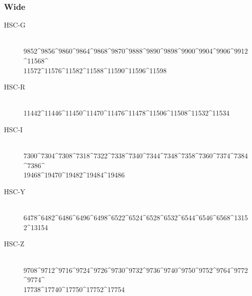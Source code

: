 \documentclass[DM,lsstdraft,STS,toc]{lsstdoc}
\begin{document}
\subsubsection{Wide}

\begin{description}

\item[HSC-G]{\hfill \\ 9852\^{}9856\^{}9860\^{}9864\^{}9868\^{}9870\^{}9888\^{}9890\^{}9898\^{}9900\^{}9904\^{}9906\^{}9912\^{}11568\^{}\\11572\^{}11576\^{}11582\^{}11588\^{}11590\^{}11596\^{}11598}
\item[HSC-R]{\hfill \\ 11442\^{}11446\^{}11450\^{}11470\^{}11476\^{}11478\^{}11506\^{}11508\^{}11532\^{}11534}
\item[HSC-I]{\hfill \\ 7300\^{}7304\^{}7308\^{}7318\^{}7322\^{}7338\^{}7340\^{}7344\^{}7348\^{}7358\^{}7360\^{}7374\^{}7384\^{}7386\^{}\\19468\^{}19470\^{}19482\^{}19484\^{}19486}
\item[HSC-Y]{\hfill \\ 6478\^{}6482\^{}6486\^{}6496\^{}6498\^{}6522\^{}6524\^{}6528\^{}6532\^{}6544\^{}6546\^{}6568\^{}13152\^{}13154}
\item[HSC-Z]{\hfill \\ 9708\^{}9712\^{}9716\^{}9724\^{}9726\^{}9730\^{}9732\^{}9736\^{}9740\^{}9750\^{}9752\^{}9764\^{}9772\^{}9774\^{}\\17738\^{}17740\^{}17750\^{}17752\^{}17754}

\end{description}
\end{document}
